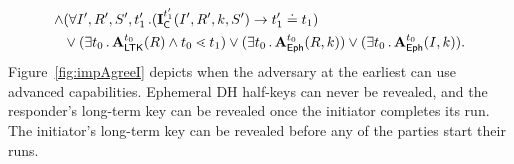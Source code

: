 {\begin{align*}
      \land &(\forall I', R', S', t_1'\operatorname{.}
        (\mathbf{I}_{\textsf{C}}^{t_1'}(I', R', k, S') \rightarrow t_1' \doteq t_1
        )\\
    &\lor(\exists t_0\operatorname{.} \mathbf{A}_{\textsf{LTK}}^{t_0}(R) \land t_0 \lessdot t_1)
    \lor(\exists t_0\operatorname{.} \mathbf{A}_{\textsf{Eph}}^{t_0}(R, k))
    \lor(\exists t_0\operatorname{.} \mathbf{A}_{\textsf{Eph}}^{t_0}(I, k)).
\end{align*}
%
Figure~\ref{fig:impAgreeI} depicts when the adversary at the earliest can use
advanced capabilities.
%
Ephemeral DH half-keys can never be revealed, and the responder's long-term key
can be revealed once the initiator completes its run.
%
The initiator's long-term key can be revealed before any of the parties start
their runs.
%
\begin{figure}[h!]
    \begin{center}
        \tikzset{>=latex}
\end{center}
\end{figure}}
